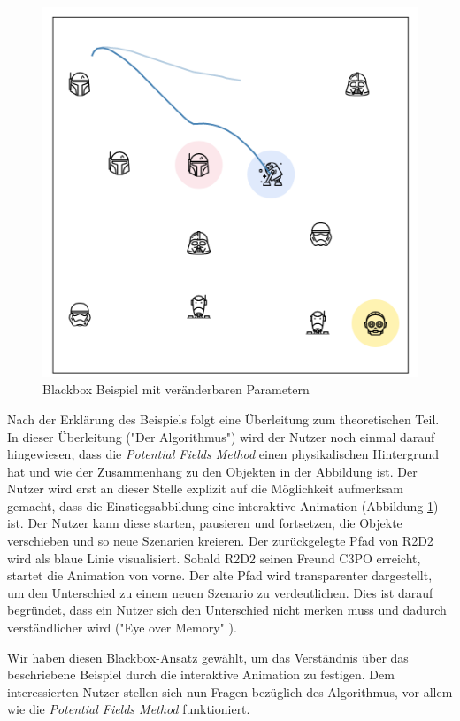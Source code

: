 \begin{figure}[h!]
  \centering
  \includegraphics[width=0.8\linewidth, height=0.8\linewidth]{img/sim2b.png}
  \caption{Blackbox Beispiel mit veränderbaren Parametern}
  \label{fig:sw_blackbox}
\end{figure}

Nach der Erklärung des Beispiels folgt eine Überleitung zum theoretischen Teil. In dieser Überleitung ("Der Algorithmus") wird der Nutzer noch einmal darauf hingewiesen, dass die \textit{Potential Fields Method} einen physikalischen Hintergrund hat und wie der Zusammenhang zu den Objekten in der Abbildung ist.
Der Nutzer wird erst an dieser Stelle explizit auf die Möglichkeit aufmerksam gemacht, dass die Einstiegsabbildung eine interaktive Animation (Abbildung \ref{fig:sw_blackbox}) ist. Der Nutzer kann diese starten, pausieren und fortsetzen, die Objekte verschieben und so neue Szenarien kreieren. Der zurückgelegte Pfad von R2D2 wird als blaue Linie visualisiert. Sobald R2D2 seinen Freund C3PO erreicht, startet die Animation von vorne. Der alte Pfad wird transparenter dargestellt, um den Unterschied zu einem neuen Szenario zu verdeutlichen. Dies ist darauf begründet, dass ein Nutzer sich den Unterschied nicht merken muss und dadurch verständlicher wird ("Eye over Memory" \cite{munzner2015visualization}).

Wir haben diesen Blackbox-Ansatz gewählt, um das Verständnis über das beschriebene Beispiel durch die interaktive Animation zu festigen. Dem interessierten Nutzer stellen sich nun Fragen bezüglich des Algorithmus, vor allem wie die \textit{Potential Fields Method} funktioniert.

